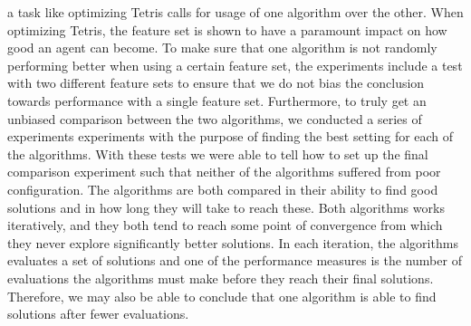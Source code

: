 a task like optimizing Tetris calls for usage of one algorithm over the other.
When optimizing Tetris, the feature set is shown to have a paramount impact on
how good an agent can become. To make sure that one algorithm is not randomly performing
better when using a certain feature set, the experiments include a test with two different 
feature sets to ensure that we do not bias the conclusion towards performance with a 
single feature set. Furthermore, to truly get an unbiased comparison between the two 
algorithms, we conducted a series of experiments experiments with the purpose of finding
the best setting for each of the algorithms. With these tests we were able to 
tell how to set up the final comparison experiment such that neither of the
algorithms suffered from poor configuration. The algorithms are both 
compared in their ability to find good solutions and in how long they will 
take to reach these. Both algorithms works iteratively, and they both tend to
reach some point of convergence from which they never explore significantly better 
solutions. In each iteration, the algorithms evaluates a set of solutions and one of the
performance measures is the number of evaluations the algorithms must make 
before they reach their final solutions. Therefore, we may also be able to conclude 
that one algorithm is able to find solutions after fewer evaluations.





